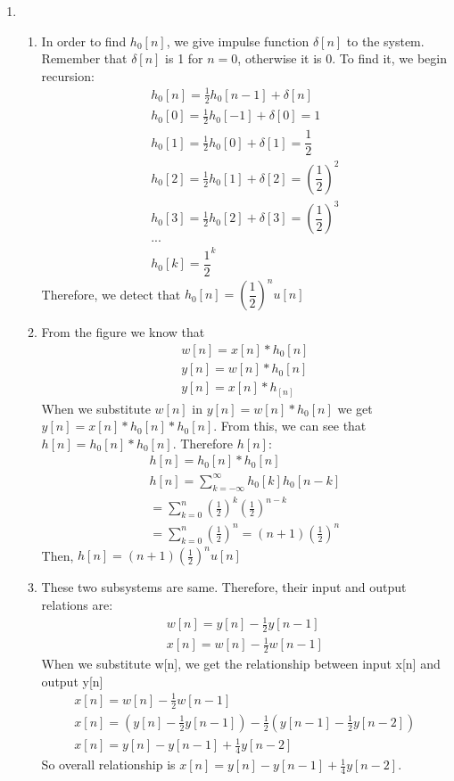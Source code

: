 \documentclass[10pt,a4paper, margin=1in]{article}
\begin{document}
\begin{enumerate}
\item %
    \begin{enumerate}
    \item %
    In order to find $h_0[n]$, we give impulse function $\delta[n]$ to the system. Remember that $\delta[n]$ is 1 for $n=0$, otherwise it is 0. To find it, we begin recursion:
    \begin{gather*}
        h_0[n]=\frac{1}{2}h_0[n-1]+\delta [n]\\
        h_0[0] = \frac{1}{2}h_0[-1]+\delta [0] = 1 \\
        h_0[1] = \frac{1}{2}h_0[0]+\delta [1] = \dfrac{1}{2}\\
        h_0[2] = \frac{1}{2}h_0[1]+\delta [2] = (\dfrac{1}{2})^2\\
        h_0[3] = \frac{1}{2}h_0[2]+\delta [3] = (\dfrac{1}{2})^3\\
        ...\\
        h_0[k] = \dfrac{1}{2}^k
    \end{gather*}
    Therefore, we detect that $h_0[n] =(\dfrac{1}{2})^nu[n] $ \\
    \item %
    From the figure we know that 
    \begin{gather*}
        w[n]= x[n]*h_0[n] \\
        y[n]= w[n]*h_0[n] \\
        y[n] = x[n]*h_[n]
    \end{gather*}
    When we substitute $w[n]$ in $ y[n]= w[n]*h_0[n]$ we get $y[n] = x[n]*h_0[n]*h_0[n]$. From this, we can see that $h[n] = h_0[n]*h_0[n]$. Therefore $h[n]$:
    \begin{gather*}
        h[n]=h_0[n]\ast h_0[n] \\
        h[n]=\sum_{k=-\infty}^\infty h_0[k]h_0[n-k]\\
        = \sum_{k=0}^n(\frac{1}{2})^k(\frac{1}{2})^{n-k}\\
        =\sum_{k=0}^n(\frac{1}{2})^n
        =(n+1)(\frac{1}{2})^n
    \end{gather*}
    Then, $h[n] = (n+1)(\frac{1}{2})^nu[n]$
    \item %
    These two subsystems are same. Therefore, their input and output relations are:
    \begin{gather*}
        w[n]=y[n]-\frac{1}{2}y[n-1] \\
        x[n]=w[n]-\frac{1}{2}w[n-1] 
    \end{gather*}
    When we substitute w[n], we get the relationship between input x[n] and output y[n]
    \begin{gather*}
        x[n]=w[n]-\frac{1}{2}w[n-1] \\ 
        x[n]=(y[n]-\frac{1}{2}y[n-1])-\frac{1}{2}(y[n-1]-\frac{1}{2}y[n-2]) \\
        x[n]=y[n]-y[n-1]+\frac{1}{4}y[n-2]
    \end{gather*}
    So overall relationship is $x[n]=y[n]-y[n-1]+\frac{1}{4}y[n-2]$.
    \end{enumerate}

\end{enumerate}
\end{document}
